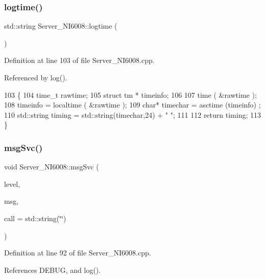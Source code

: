 \subsubsection{\texorpdfstring{logtime()}{logtime()}}
{\footnotesize\ttfamily std\+::string Server\+\_\+\+N\+I6008\+::logtime (\begin{DoxyParamCaption}{ }\end{DoxyParamCaption})\hspace{0.3cm}{\ttfamily [private]}}



Definition at line 103 of file Server\+\_\+\+N\+I6008.\+cpp.



Referenced by log().


\begin{DoxyCode}
103                                 \{
104   time\_t rawtime;
105   \textcolor{keyword}{struct }tm * timeinfo;
106   
107   time ( &rawtime );
108   timeinfo = localtime ( &rawtime );
109   \textcolor{keywordtype}{char}* timechar =  asctime (timeinfo) ;
110   std::string timing = std::string(timechar,24) + \textcolor{stringliteral}{" "};
111 
112   \textcolor{keywordflow}{return} timing;
113 \}
\end{DoxyCode}
\mbox{\label{classServer__NI6008_a140d5f91d6c0f4fb963ecf747e44df78}} 
\subsubsection{\texorpdfstring{msg\+Svc()}{msgSvc()}}
{\footnotesize\ttfamily void Server\+\_\+\+N\+I6008\+::msg\+Svc (\begin{DoxyParamCaption}\item[{\hyperlink{classServer__NI6008_af1e3e3bac26355a746b5d2e548fe25be}{Msg\+Level}}]{level,  }\item[{std\+::string}]{msg,  }\item[{std\+::string}]{call = {\ttfamily std\+:\+:string(\char`\"{}\char`\"{})} }\end{DoxyParamCaption})}



Definition at line 92 of file Server\+\_\+\+N\+I6008.\+cpp.



References D\+E\+B\+UG, and log().



